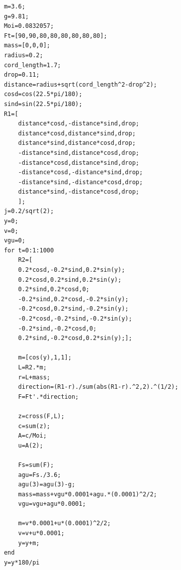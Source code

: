 \documentclass[UTF8]{article}
\begin{document}
\begin{appendices}
\centerline{}
 \begin{verbatim}
            m=3.6;
            g=9.81;
            Moi=0.0832057;
            Ft=[90,90,80,80,80,80,80,80];
            mass=[0,0,0];
            radius=0.2;
            cord_length=1.7;
            drop=0.11;
            distance=radius+sqrt(cord_length^2-drop^2);
            cosd=cos(22.5*pi/180);
            sind=sin(22.5*pi/180);
            R1=[
                distance*cosd,-distance*sind,drop;
                distance*cosd,distance*sind,drop;
                distance*sind,distance*cosd,drop;
                -distance*sind,distance*cosd,drop;
                -distance*cosd,distance*sind,drop;
                -distance*cosd,-distance*sind,drop;
                -distance*sind,-distance*cosd,drop;
                distance*sind,-distance*cosd,drop;
                ];
            j=0.2/sqrt(2);
            y=0;
            v=0;
            vgu=0;
            for t=0:1:1000
                R2=[
                0.2*cosd,-0.2*sind,0.2*sin(y);
                0.2*cosd,0.2*sind,0.2*sin(y);
                0.2*sind,0.2*cosd,0;
                -0.2*sind,0.2*cosd,-0.2*sin(y);
                -0.2*cosd,0.2*sind,-0.2*sin(y);
                -0.2*cosd,-0.2*sind,-0.2*sin(y);
                -0.2*sind,-0.2*cosd,0;
                0.2*sind,-0.2*cosd,0.2*sin(y);];
            
                m=[cos(y),1,1];
                L=R2.*m;
                r=L+mass;
                direction=(R1-r)./sum(abs(R1-r).^2,2).^(1/2);
                F=Ft'.*direction;
                
                z=cross(F,L);
                c=sum(z);
                A=c/Moi;
                u=A(2);
                
                Fs=sum(F);
                agu=Fs./3.6;
                agu(3)=agu(3)-g;
                mass=mass+vgu*0.0001+agu.*(0.0001)^2/2;
                vgu=vgu+agu*0.0001;
                
                m=v*0.0001+u*(0.0001)^2/2;
                v=v+u*0.0001;
                y=y+m;
            end
            y=y*180/pi
            

\end{verbatim}
\end{appendices}
\end{document}
